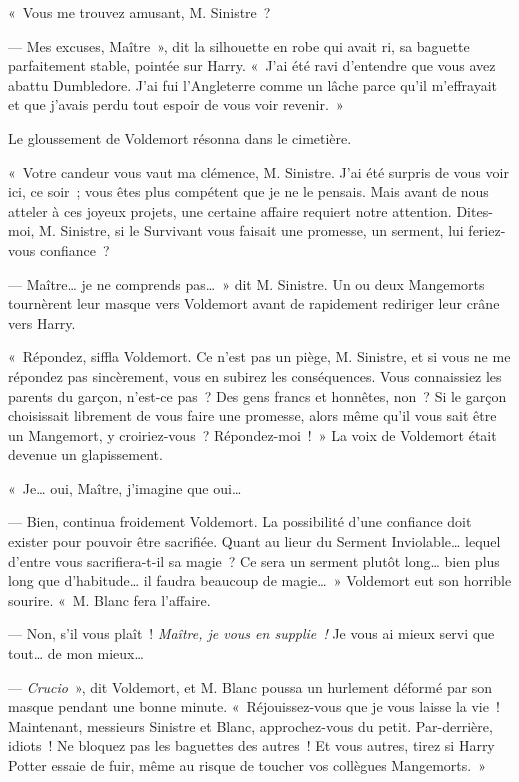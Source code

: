 «~Vous me trouvez amusant, M. Sinistre~?

--- Mes excuses, Maître~», dit la silhouette en robe qui avait ri, sa baguette parfaitement stable, pointée sur Harry.
«~J'ai été ravi d'entendre que vous avez abattu Dumbledore.
J'ai fui l'Angleterre comme un lâche parce qu'il m'effrayait et que j'avais perdu tout espoir de vous voir revenir.~»

Le gloussement de Voldemort résonna dans le cimetière.

«~Votre candeur vous vaut ma clémence, M. Sinistre.
J'ai été surpris de vous voir ici, ce soir~; vous êtes plus compétent que je ne le pensais.
Mais avant de nous atteler à ces joyeux projets, une certaine affaire requiert notre attention.
Dites-moi, M. Sinistre, si le Survivant vous faisait une promesse, un serment, lui feriez-vous confiance~?

--- Maître… je ne comprends pas…~»
dit M. Sinistre.
Un ou deux Mangemorts tournèrent leur masque vers Voldemort avant de rapidement rediriger leur crâne vers Harry.

«~Répondez, siffla Voldemort.
Ce n'est pas un piège, M. Sinistre, et si vous ne me répondez pas sincèrement, vous en subirez les conséquences.
Vous connaissiez les parents du garçon, n'est-ce pas~?
Des gens francs et honnêtes, non~?
Si le garçon choisissait librement de vous faire une promesse, alors même qu'il vous sait être un Mangemort, y croiriez-vous~?
Répondez-moi~!~»
La voix de Voldemort était devenue un glapissement.

«~Je… oui, Maître, j'imagine que oui…

--- Bien, continua froidement Voldemort.
La possibilité d'une confiance doit exister pour pouvoir être sacrifiée.
Quant au lieur du Serment Inviolable… lequel d'entre vous sacrifiera-t-il sa magie~?
Ce sera un serment plutôt long… bien plus long que d'habitude… il faudra beaucoup de magie…~»
Voldemort eut son horrible sourire.
«~M. Blanc fera l'affaire.

--- Non, s'il vous plaît~!
\emph{Maître, je vous en supplie~!} Je vous ai mieux servi que tout… de mon mieux…

--- \emph{Crucio}~», dit Voldemort, et M. Blanc poussa un hurlement déformé par son masque pendant une bonne minute.
«~Réjouissez-vous que je vous laisse la vie~!
Maintenant, messieurs Sinistre et Blanc, approchez-vous du petit.
Par-derrière, idiots~!
Ne bloquez pas les baguettes des autres~!
Et vous autres, tirez si Harry Potter essaie de fuir, même au risque de toucher vos collègues Mangemorts.~»


